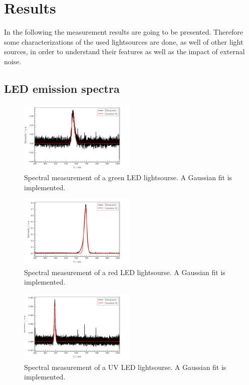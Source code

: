 

\section{Results}
\label{sec:Results}

In the following the measurement results are going to be presented. 
Therefore some characterizations of the used lightsources are done, as well of other light sources, in order to understand their features as well as the impact of external noise.

\subsection{LED emission spectra}
\label{sec:LED}

\begin{figure}
    \includegraphics[width=0.5\textwidth]{plots/LED-Green.pdf}
    \caption{Spectral measurement of a green LED lightsourse. A Gaussian fit is implemented.}
    \label{fig:LEDG}
\end{figure}
\begin{figure}
    \includegraphics[width=0.5\textwidth]{plots/LED-Red.pdf}
    \caption{Spectral measurement of a red LED lightsourse. A Gaussian fit is implemented.}
    \label{fig:LEDR}
\end{figure}
\begin{figure}
    \includegraphics[width=0.5\textwidth]{plots/LED-UV.pdf}
    \caption{Spectral measurement of a UV LED lightsourse. A Gaussian fit is implemented.}
    \label{fig:LEDUV}
\end{figure}
    

